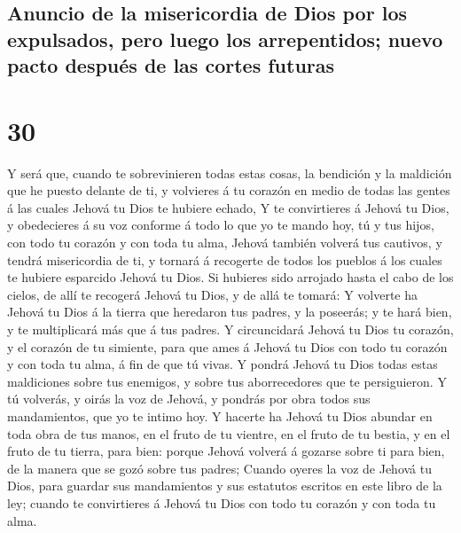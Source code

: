 \hypertarget{anuncio-de-la-misericordia-de-dios-por-los-expulsados-pero-luego-los-arrepentidos-nuevo-pacto-despuuxe9s-de-las-cortes-futuras}{%
\subsection{Anuncio de la misericordia de Dios por los expulsados, pero
luego los arrepentidos; nuevo pacto después de las cortes
futuras}\label{anuncio-de-la-misericordia-de-dios-por-los-expulsados-pero-luego-los-arrepentidos-nuevo-pacto-despuuxe9s-de-las-cortes-futuras}}

\hypertarget{section-05-30}{%
\section{30}\label{section-05-30}}

 Y será que, cuando te sobrevinieren todas estas cosas, la
bendición y la maldición que he puesto delante de ti, y volvieres á tu
corazón en medio de todas las gentes á las cuales Jehová tu Dios te
hubiere echado,  Y te convirtieres á Jehová tu Dios, y
obedecieres á su voz conforme á todo lo que yo te mando hoy, tú y tus
hijos, con todo tu corazón y con toda tu alma,  Jehová
también volverá tus cautivos, y tendrá misericordia de ti, y tornará á
recogerte de todos los pueblos á los cuales te hubiere esparcido Jehová
tu Dios.  Si hubieres sido arrojado hasta el cabo de los
cielos, de allí te recogerá Jehová tu Dios, y de allá te tomará:
 Y volverte ha Jehová tu Dios á la tierra que heredaron
tus padres, y la poseerás; y te hará bien, y te multiplicará más que á
tus padres.  Y circuncidará Jehová tu Dios tu corazón, y
el corazón de tu simiente, para que ames á Jehová tu Dios con todo tu
corazón y con toda tu alma, á fin de que tú vivas.  Y
pondrá Jehová tu Dios todas estas maldiciones sobre tus enemigos, y
sobre tus aborrecedores que te persiguieron.  Y tú
volverás, y oirás la voz de Jehová, y pondrás por obra todos sus
mandamientos, que yo te intimo hoy.  Y hacerte ha Jehová
tu Dios abundar en toda obra de tus manos, en el fruto de tu vientre, en
el fruto de tu bestia, y en el fruto de tu tierra, para bien: porque
Jehová volverá á gozarse sobre ti para bien, de la manera que se gozó
sobre tus padres;  Cuando oyeres la voz de Jehová tu
Dios, para guardar sus mandamientos y sus estatutos escritos en este
libro de la ley; cuando te convirtieres á Jehová tu Dios con todo tu
corazón y con toda tu alma.

